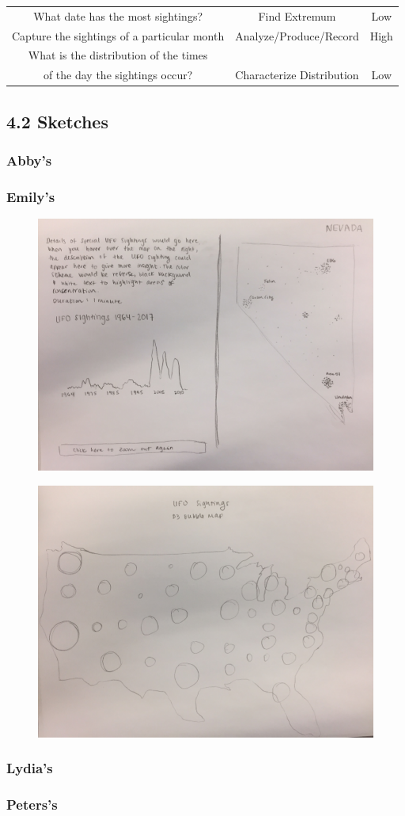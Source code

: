 \documentclass{neu_handout}
\begin{document}
\begin{table}[h]
\begin{tabular}{c c c}
What date has the most sightings? &
Find Extremum &
Low \\[1ex] %

Capture the sightings of a particular month &
Analyze/Produce/Record &
High \\[1ex] %

What is the distribution of the times\\ of the day the sightings occur? &
Characterize Distribution &
Low \\


\hline 
\end{tabular}
\label{tab:PPer}
\end{table}

\subsection*{4.2 Sketches}

\subsubsection*{Abby's}

\subsubsection*{Emily's}
\begin{figure}[h]
\centering
{
\includegraphics[width=0.5\linewidth]{emily1}
}
\end{figure}

\begin{figure}[h]
\centering
{
\includegraphics[width=0.5\linewidth]{emily2}
}
\end{figure}

\subsubsection*{Lydia's}

\subsubsection*{Peters's}
\end{document}
